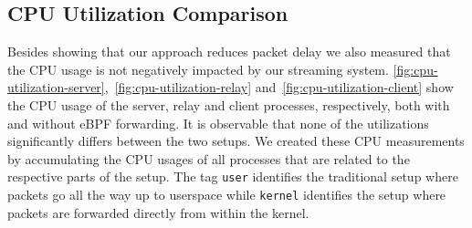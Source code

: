 \subsection{CPU Utilization Comparison}
Besides showing that our approach reduces packet delay we also measured that the CPU usage is 
not negatively impacted by our streaming system.
\autoref{fig:cpu-utilization-server},~\ref{fig:cpu-utilization-relay} and~\ref{fig:cpu-utilization-client}
show the CPU usage of the server, relay and client processes, respectively, both with and without eBPF forwarding.
It is observable that none of the utilizations significantly differs between the two setups.
We created these CPU measurements by accumulating the CPU usages of all processes that are related 
to the respective parts of the setup.
The tag \verb|user| identifies the traditional setup where packets go all the way up to userspace while 
\verb|kernel| identifies the setup where packets are forwarded directly from within the kernel.

